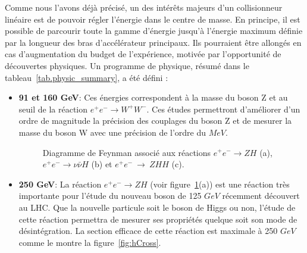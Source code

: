 Comme nous l'avons déjà précisé, un des intérêts majeurs d'un collisionneur linéaire est de pouvoir régler l'énergie dans le centre de masse. En principe, il est possible de parcourir toute la gamme d'énergie jusqu'à l'énergie maximum définie par la longueur des bras d'accélérateur principaux. Ils pourraient être allongés en cas d'augmentation du budget de l'expérience, motivée par l'opportunité de découvertes physiques. Un programme de physique, résumé dans le tableau~\ref{tab.physic_summary}, a été défini \cite{physicsTDR}:
\begin{itemize}
\item \textbf{91 et 160 GeV}: Ces énergies correspondent à la masse du boson Z et au seuil de la réaction $e^+e^-\rightarrow W^+W^-$. Ces études permettront d'améliorer d'un ordre de magnitude la précision des couplages du boson Z et de mesurer la masse du boson W avec une précision de l'ordre du $MeV$.
\begin{figure}[!h]
  \begin{center}
    \caption{Diagramme de Feynman associé aux réactions $e^+e^-\rightarrow ZH$ (a), $e^+e^-\rightarrow \nu\bar{\nu}H$ (b) et $e^+e^-~\rightarrow~ZHH$ (c).}
     \label{fig:feynmanILC}
  \end{center}
\end{figure}
\item \textbf{250 GeV}: La réaction $e^+e^-\rightarrow ZH$ (voir figure~\ref{fig:feynmanILC}(a)) est une réaction très importante pour l'étude du nouveau boson de 125 $GeV$ récemment découvert au LHC. Que la nouvelle particule soit le boson de Higgs ou non, l'étude de cette réaction permettra de mesurer ses propriétés quelque soit son mode de désintégration. La section efficace de cette réaction est maximale à 250 $GeV$ comme le montre la figure~\ref{fig:hCross}.

\end{itemize}
